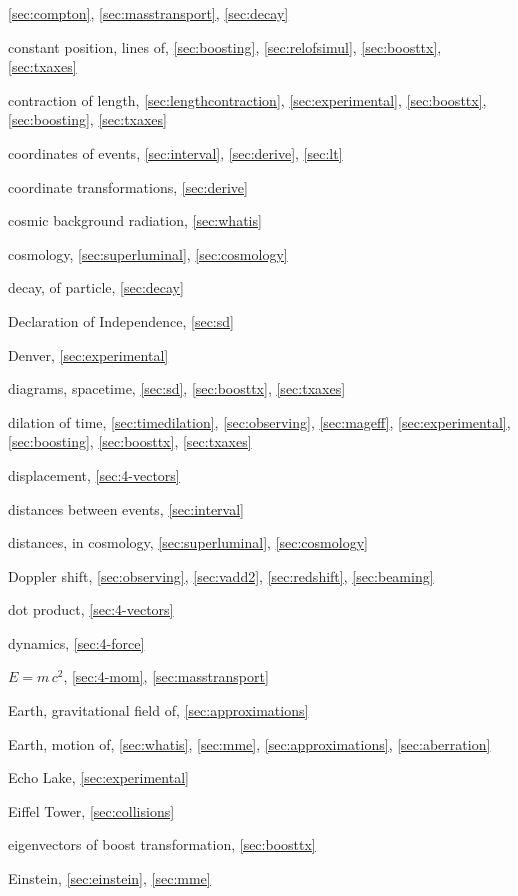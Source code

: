 \begin{theindex}
	\ref{sec:compton}, \ref{sec:masstransport}, \ref{sec:decay}
\item constant position, lines of, \ref{sec:boosting}, \ref{sec:relofsimul},
	\ref{sec:boosttx}, \ref{sec:txaxes}
\item contraction of length, \ref{sec:lengthcontraction},
	\ref{sec:experimental}, \ref{sec:boosttx}, \ref{sec:boosting},
	\ref{sec:txaxes}
\item coordinates of events, \ref{sec:interval}, \ref{sec:derive},
	\ref{sec:lt}
\item coordinate transformations, \ref{sec:derive}
\item cosmic background radiation, \ref{sec:whatis}
\item cosmology, \ref{sec:superluminal}, \ref{sec:cosmology}
\item decay, of particle, \ref{sec:decay}
\item Declaration of Independence, \ref{sec:sd}
\item Denver, \ref{sec:experimental}
\item diagrams, spacetime, \ref{sec:sd}, \ref{sec:boosttx}, \ref{sec:txaxes}
\item dilation of time, \ref{sec:timedilation}, \ref{sec:observing},
	\ref{sec:mageff}, \ref{sec:experimental}, \ref{sec:boosting},
	\ref{sec:boosttx}, \ref{sec:txaxes}
\item displacement, \ref{sec:4-vectors}
\item distances between events, \ref{sec:interval}
\item distances, in cosmology, \ref{sec:superluminal}, \ref{sec:cosmology}
\item Doppler shift, \ref{sec:observing}, \ref{sec:vadd2},
	\ref{sec:redshift}, \ref{sec:beaming}
\item dot product, \ref{sec:4-vectors}
\item dynamics, \ref{sec:4-force}
\item $E=m\,c^2$, \ref{sec:4-mom}, \ref{sec:masstransport}
\item Earth, gravitational field of, \ref{sec:approximations}
\item Earth, motion of, \ref{sec:whatis}, \ref{sec:mme},
	\ref{sec:approximations}, \ref{sec:aberration}
\item Echo Lake, \ref{sec:experimental}
\item Eiffel Tower, \ref{sec:collisions}
\item eigenvectors of boost transformation, \ref{sec:boosttx}
\item Einstein, \ref{sec:einstein}, \ref{sec:mme}

\end{theindex}
